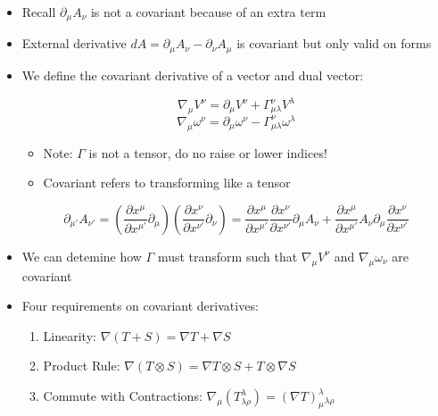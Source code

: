 \begin{itemize}
    \begin{itemize}

      \item Recall $\partial_{\mu}A_{\nu}$ is not a covariant because of an extra term

      \item External derivative $dA=\partial_{\mu}A_{\nu}-\partial_{\nu}A_{\mu}$ is covariant but only valid on forms

      \item We define the covariant derivative of a vector and dual vector:

        $$\nabla_{\mu}V^{\nu}=\partial_{\mu}V^{\nu}+\Gamma^{\nu}_{\mu\lambda}V^{\lambda}$$
        $$\nabla_{\mu}\omega^{\nu}=\partial_{\mu}\omega^{\nu}-\Gamma^{\nu}_{\mu\lambda}\omega^{\lambda}$$

        \begin{itemize}

          \item Note: $\Gamma$ is not a tensor, do no raise or lower indices!

          \item Covariant refers to transforming like a tensor

        \end{itemize}

        $$\partial_{\mu'}A_{\nu'}=\left( \frac{\partial x^{\mu}}{\partial x^{\mu'}}\partial_{\mu} \right)\left( \frac{\partial x^{\nu}}{\partial x^{\nu'}}\partial_{\nu} \right)=\frac{\partial x^{\mu}}{\partial x^{\mu'}}\frac{\partial x^{\nu}}{\partial x^{\nu'}}\partial_{\mu}A_{\nu}+\frac{\partial x^{\mu}}{\partial x^{\mu'}}A_{\nu}\partial_{\mu}\frac{\partial x^{\nu}}{\partial x^{\nu'}}$$

      \item We can detemine how $\Gamma$ must transform such that $\nabla_{\mu}V^{\nu}$ and $\nabla_{\mu}\omega_{\nu}$ are covariant

      \item Four requirements on covariant derivatives:

        \begin{enumerate}

          \item Linearity: $\nabla(T+S)=\nabla T+\nabla S$

          \item Product Rule: $\nabla(T\otimes S)=\nabla T\otimes S+T\otimes\nabla S$

          \item Commute with Contractions: $\nabla_{\mu}(T^{\lambda}_{\lambda\rho})=(\nabla T)_{\mu}^{\lambda}_{\lambda\rho}$


\end{enumerate}
\end{itemize}
\end{itemize}
